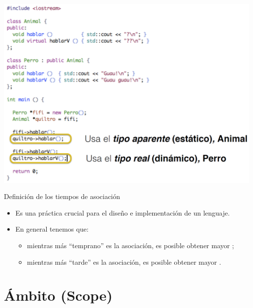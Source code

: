 \documentclass{beamer} %
\newcommand{\redb}[1]{{\color{red!70!black}{#1}}}
\begin{document}
\begin{frame}{}
    \begin{center}
        \includegraphics[width=\textwidth]{./image/cap5/ex-virtual}
    \end{center}
\end{frame}

\begin{frame}{Definición de los tiempos de asociación}
    \begin{itemize}
        \item Es una práctica crucial para el diseño e implementación de un lenguaje.
        \item En general tenemos que:
        \begin{itemize}
            \item mientras más ``temprano'' es la asociación, es posible obtener mayor \redb{eficiencia};
            \item mientras más ``tarde'' es la asociación, es posible obtener mayor \redb{flexibilidad}.
        \end{itemize}
    \end{itemize}
\end{frame}

\section{Ámbito (Scope)}
\end{document}

